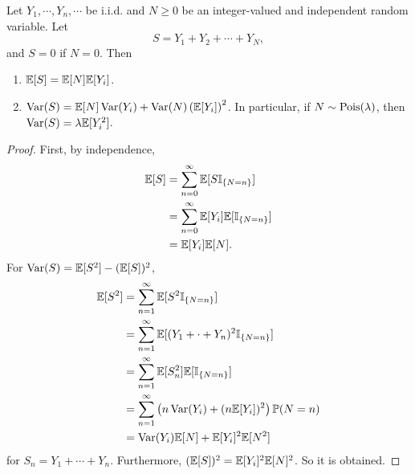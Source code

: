 \begin{thm}
    Let $Y_1,\cdots,Y_n,\cdots$ be i.i.d. and $N \geq 0$ be an integer-valued and independent random variable. Let
    \begin{equation*}
        S = Y_1 + Y_2 + \cdots + Y_N,
    \end{equation*}
    and $S = 0$ if $N = 0$. Then
    \begin{enumerate}[label=(\roman{*})]
        \item $\mathbb{E}[S] = \mathbb{E}[N]\mathbb{E}[Y_i]$.
        \item $\operatorname{Var}(S) = \mathbb{E}[N]\operatorname{Var}(Y_i) + \operatorname{Var}(N)\left(\mathbb{E}[Y_i]\right)^2$. In particular, if $N \sim \operatorname{Pois}(\lambda)$, then $\operatorname{Var}(S) = \lambda \mathbb{E}[Y_i^2]$.
    \end{enumerate}
\end{thm}
\begin{proof}
    First, by independence,
    \begin{equation*}
        \begin{aligned}
            \mathbb{E}[S] & = \sum_{n = 0}^\infty \mathbb{E}[S\mathbb{I}_{\left\{N=n\right\}}] \\
            &= \sum_{n = 0}^\infty \mathbb{E}[Y_i]\mathbb{E}[\mathbb{I}_{\left\{N=n\right\}}] \\
            &= \mathbb{E}[Y_i] \mathbb{E}[N].
        \end{aligned}
    \end{equation*}
    For $\operatorname{Var}(S) = \mathbb{E}[S^2] - (\mathbb{E}[S])^2$,
    \begin{equation*}
        \begin{aligned}
            \mathbb{E}[S^2] &= \sum_{n=1}^\infty \mathbb{E}[S^2\mathbb{I}_{\left\{N=n\right\}}] \\
            &= \sum_{n=1}^\infty \mathbb{E}[(Y_1 + \cdot +Y_n)^2\mathbb{I}_{\left\{N=n\right\}}] \\
            &= \sum_{n=1}^\infty \mathbb{E}[S_n^2]\mathbb{E}[\mathbb{I}_{\left\{N=n\right\}}]\\
            &= \sum_{n=1}^\infty\left(n\operatorname{Var}(Y_i) + (n\mathbb{E}[Y_i])^2\right)\mathbb{P}(N = n)\\
            &= \operatorname{Var}(Y_i)\mathbb{E}[N]+ \mathbb{E}[Y_i]^2\mathbb{E}[N^2]
        \end{aligned}
    \end{equation*}
    for $S_n = Y_1 + \cdots + Y_n$. Furthermore, $(\mathbb{E}[S])^2 = \mathbb{E}[Y_i]^2 \mathbb{E}[N]^2$. So it is obtained.
\end{proof}

